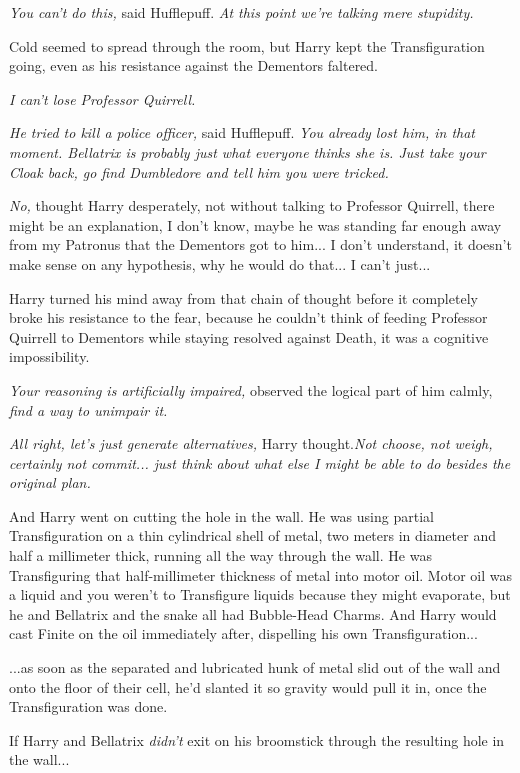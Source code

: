 \emph{You can't do this,} said Hufflepuff. \emph{At this point we're
talking mere stupidity.}

Cold seemed to spread through the room, but Harry kept the
Transfiguration going, even as his resistance against the Dementors
faltered.

\emph{I can't lose Professor Quirrell.}

\emph{He tried to kill a police officer,} said Hufflepuff. \emph{You
already lost him, in that moment. Bellatrix is probably just what
everyone thinks she is. Just take your Cloak back, go find Dumbledore
and tell him you were tricked.}

\emph{No,} thought Harry desperately, not without talking to Professor
Quirrell, there might be an explanation, I don't know, maybe he was
standing far enough away from my Patronus that the Dementors got to
him... I don't understand, it doesn't make sense on any hypothesis,
why he would do that... I can't just...

Harry turned his mind away from that chain of thought before it
completely broke his resistance to the fear, because he couldn't think
of feeding Professor Quirrell to Dementors while staying resolved
against Death, it was a cognitive impossibility.

\emph{Your reasoning is artificially impaired,} observed the logical
part of him calmly, \emph{find a way to unimpair it.}

\emph{All right, let's just generate alternatives,} Harry
thought.\emph{Not choose, not weigh, certainly not commit... just
think about what else I might be able to do besides the original plan.}

And Harry went on cutting the hole in the wall. He was using partial
Transfiguration on a thin cylindrical shell of metal, two meters in
diameter and half a millimeter thick, running all the way through the
wall. He was Transfiguring that half-millimeter thickness of metal into
motor oil. Motor oil was a liquid and you weren't to Transfigure liquids
because they might evaporate, but he and Bellatrix and the snake all had
Bubble-Head Charms. And Harry would cast Finite on the oil immediately
after, dispelling his own Transfiguration...

...as soon as the separated and lubricated hunk of metal slid out
of the wall and onto the floor of their cell, he'd slanted it so gravity
would pull it in, once the Transfiguration was done.

If Harry and Bellatrix \emph{didn't} exit on his broomstick through the
resulting hole in the wall...

